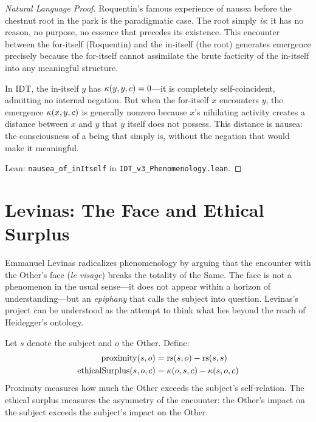 \begin{proof}[Natural Language Proof]
Roquentin's famous experience of nausea before the chestnut root in the park
is the paradigmatic case.  The root simply \emph{is}: it has no reason, no
purpose, no essence that precedes its existence.  This encounter between
the for-itself (Roquentin) and the in-itself (the root) generates emergence
precisely because the for-itself cannot assimilate the brute facticity of
the in-itself into any meaningful structure.

In IDT, the in-itself $y$ has $\kappa(y, y, c) = 0$---it is completely
self-coincident, admitting no internal negation.  But when the for-itself
$x$ encounters $y$, the emergence $\kappa(x, y, c)$ is generally nonzero
because $x$'s nihilating activity creates a distance between $x$ and $y$
that $y$ itself does not possess.  This distance is nausea: the
consciousness of a being that simply is, without the negation that would
make it meaningful.

Lean: \texttt{nausea\_of\_inItself} in \texttt{IDT\_v3\_Phenomenology.lean}.
\end{proof}

\section{Levinas: The Face and Ethical Surplus}

Emmanuel Levinas radicalizes phenomenology by arguing that the encounter with
the Other's face (\textit{le visage}) breaks the totality of the Same.  The face
is not a phenomenon in the usual sense---it does not appear within a horizon of
understanding---but an \emph{epiphany} that calls the subject into question.
Levinas's project can be understood as the attempt to think what lies beyond
the reach of Heidegger's ontology.

\begin{definition}
\label{def:levinas-proximity}
Let $s$ denote the subject and $o$ the Other.  Define:
\begin{align}
\mathrm{proximity}(s, o) &= \mathrm{rs}(s, o) - \mathrm{rs}(s, s) \\
\mathrm{ethicalSurplus}(s, o, c) &= \kappa(o, s, c) - \kappa(s, o, c)
\end{align}
Proximity measures how much the Other exceeds the subject's self-relation.
The ethical surplus measures the asymmetry of the encounter: the Other's
impact on the subject exceeds the subject's impact on the Other.
\end{definition}

